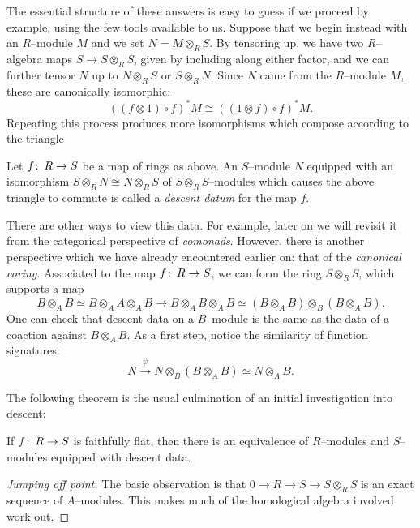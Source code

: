 The essential structure of these answers is easy to guess if we proceed by example, using the few tools available to us.  Suppose that we begin instead with an $R$--module $M$ and we set $N = M \otimes_R S$.  By tensoring up, we have two $R$--algebra maps $S \to S \otimes_R S$, given by including along either factor, and we can further tensor $N$ up to $N \otimes_R S$ or $S \otimes_R N$.  Since $N$ came from the $R$--module $M$, these are canonically isomorphic: \[((f \otimes 1) \circ f)^* M \cong ((1 \otimes f) \circ f)^* M.\]  Repeating this process produces more isomorphisms which compose according to the triangle
\begin{center}
\end{center}

\begin{definition}
Let $f\colon\thinspace R \to S$ be a map of rings as above.  An $S$--module $N$ equipped with an isomorphism $S \otimes_R N \cong N \otimes_R S$ of $S \otimes_R S$--modules which causes the above triangle to commute is called a \textit{descent datum} for the map $f$.
\end{definition}

\begin{remark}\label{CanonicalCoring}
There are other ways to view this data.  For example, later on we will revisit it from the categorical perspective of \textit{comonads}.  However, there is another perspective which we have already encountered earlier on: that of the \textit{canonical coring}.  Associated to the map $f\colon\thinspace R \to S$, we can form the ring $S \otimes_R S$, which supports a map \[B \otimes_A B \simeq B \otimes_A A \otimes_A B \to B \otimes_A B \otimes_A B \simeq (B \otimes_A B) \otimes_B (B \otimes_A B).\]  One can check that descent data on a $B$--module is the same as the data of a coaction against $B \otimes_A B$.  As a first step, notice the similarity of function signatures: \[N \xrightarrow{\psi} N \otimes_B (B \otimes_A B) \simeq N \otimes_A B.\]
\end{remark}

The following theorem is the usual culmination of an initial investigation into descent:
\begin{theorem}[Grothendieck]
If $f\colon\thinspace R \to S$ is faithfully flat, then there is an equivalence of $R$--modules and $S$--modules equipped with descent data.
\end{theorem}
\begin{proof}[Jumping off point]
The basic observation is that $0 \to R \to S \to S \otimes_R S$ is an exact sequence of $A$--modules.  This makes much of the homological algebra involved work out.
\end{proof}

